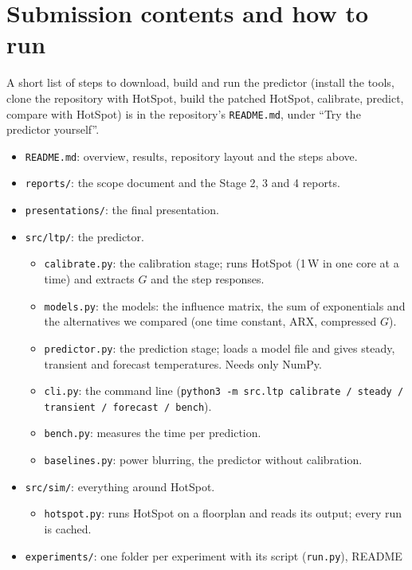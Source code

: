 \documentclass[11pt,a4paper]{article}
\begin{document}
\section{Submission contents and how to run}
A short list of steps to download, build and run the predictor (install the tools, clone the
repository with HotSpot, build the patched HotSpot, calibrate, predict, compare with HotSpot) is in
the repository's \texttt{README.md}, under ``Try the predictor yourself''.
\begin{itemize}
  \item \texttt{README.md}: overview, results, repository layout and the steps above.
  \item \texttt{reports/}: the scope document and the Stage 2, 3 and 4 reports.
  \item \texttt{presentations/}: the final presentation.
  \item \texttt{src/ltp/}: the predictor.
        \begin{itemize}
          \item \texttt{calibrate.py}: the calibration stage; runs HotSpot (1\,W in one
                core at a time) and extracts $G$ and the step responses.
          \item \texttt{models.py}: the models: the influence matrix, the sum of exponentials and
                the alternatives we compared (one time constant, ARX, compressed $G$).
          \item \texttt{predictor.py}: the prediction stage; loads a model file and gives steady,
                transient and forecast temperatures. Needs only NumPy.
          \item \texttt{cli.py}: the command line (\texttt{python3 -m src.ltp calibrate / steady /
                transient / forecast / bench}).
          \item \texttt{bench.py}: measures the time per prediction.
          \item \texttt{baselines.py}: power blurring, the predictor without calibration.
        \end{itemize}
  \item \texttt{src/sim/}: everything around HotSpot.
        \begin{itemize}
          \item \texttt{hotspot.py}: runs HotSpot on a floorplan and reads its output; every run
                is cached.
        \end{itemize}
  \item \texttt{experiments/}: one folder per experiment with its script (\texttt{run.py}), README

\end{itemize}
\end{document}
